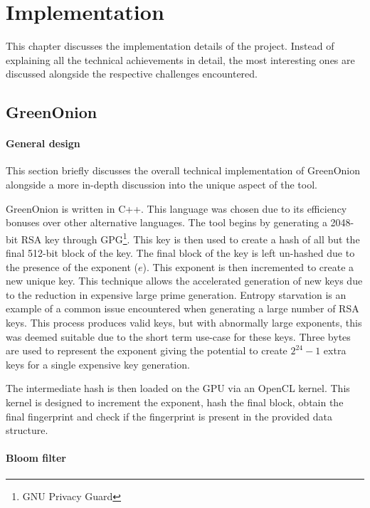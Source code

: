 \chapter{Implementation}
\label{cha:Implementation}

This chapter discusses the implementation details of the project. Instead of explaining all the technical achievements in detail, the most interesting ones are discussed alongside the respective challenges encountered.

\section{GreenOnion}

\subsubsection{General design}
This section briefly discusses the overall technical implementation of GreenOnion alongside a more in-depth discussion into the unique aspect of the tool.

GreenOnion is written in C++. This language was chosen due to its efficiency bonuses over other alternative languages.
The tool begins by generating a 2048-bit RSA key through GPG\footnote{GNU Privacy Guard}. This key is then used to create a hash of all but the final 512-bit block of the key. The final block of the key is left un-hashed due to the presence of the exponent ($e$). This exponent is then incremented to create a new unique key. This technique allows the accelerated generation of new keys due to the reduction in expensive large prime generation. Entropy starvation is an example of a common issue encountered when generating a large number of RSA keys. This process produces valid keys, but with abnormally large exponents, this was deemed suitable due to the short term use-case for these keys. Three bytes are used to represent the exponent giving the potential to create $2^{24} - 1$ extra keys for a single expensive key generation.

The intermediate hash is then loaded on the GPU via an OpenCL kernel. This kernel is designed to increment the exponent, hash the final block, obtain the final fingerprint and check if the fingerprint is present in the provided data structure.

\subsubsection{Bloom filter}

